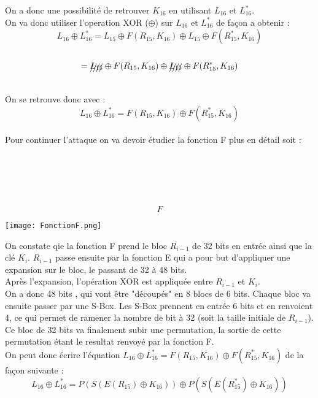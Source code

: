 \documentclass[a4paper,11pt]{article}
\begin{document}
	On a donc une possibilité de retrouver $K_{16}$ en utilisant $L_{16}$  et $L_{16}^{*}$.\\
	On va donc utiliser l'operation XOR ($\oplus$) sur $L_{16}$  et $L_{16}^{*}$ de façon a obtenir :\\
	$$L_{16}  \oplus L_{16}^{*} =  L_{15} \oplus F(R_{15}, K_{16}) \oplus  L_{15} \oplus F(R_{15}^{*}, K_{16}) $$\\
	                          $$= \xout{L_{15} } \oplus F(R_{15}, K_{16}) \oplus  \xout{L_{15} } \oplus F(R_{15}^{*}, K_{16})$$\\
	On se retrouve donc avec :\\
	$$L_{16}  \oplus L_{16}^{*} = F(R_{15}, K_{16}) \oplus F(R_{15}^{*}, K_{16})$$\\
	
	Pour continuer l'attaque on va devoir étudier la fonction F plus en détail soit :\\
	\\
	\\ \\ \\ \\ 
	$$F$$
	\begin{center}\texttt{[image: FonctionF.png]}\end{center}
	On constate qie la fonction F prend le bloc $R_{i - 1}$ de 32 bits en entrée ainsi que la clé $K_{i}$. $R_{i - 1}$ passe ensuite par la fonction  E qui a pour but d'appliquer une expansion sur le bloc, le passant de 32 à 48 bits.\\
	Après l'expansion, l'opération XOR est appliquée entre $R_{i - 1}$ et $K_{i}$.\\
	On a donc 48 bits , qui vont être "découpés" en 8 blocs de 6 bits. Chaque bloc va ensuite passer par une S-Box. Les S-Box prennent en entrée 6 bits et en renvoient 4, ce qui permet de ramener la nombre de bit à 32 (soit la taille initiale de $R_{i - 1}$).\\
	Ce bloc de 32 bits va finalement subir une permutation, la sortie de cette permutation étant le resultat renvoyé par la fonction F.\\
	On peut donc écrire l'équation $L_{16}  \oplus L_{16}^{*} = F(R_{15}, K_{16}) \oplus F(R_{15}^{*}, K_{16})$ de la façon suivante : \\
	$$L_{16}  \oplus L_{16}^{*} = P(S(E(R_{15})\oplus K_{16})) \oplus P(S(E(R_{15}^{*})\oplus K_{16}))$$
	
\end{document}
